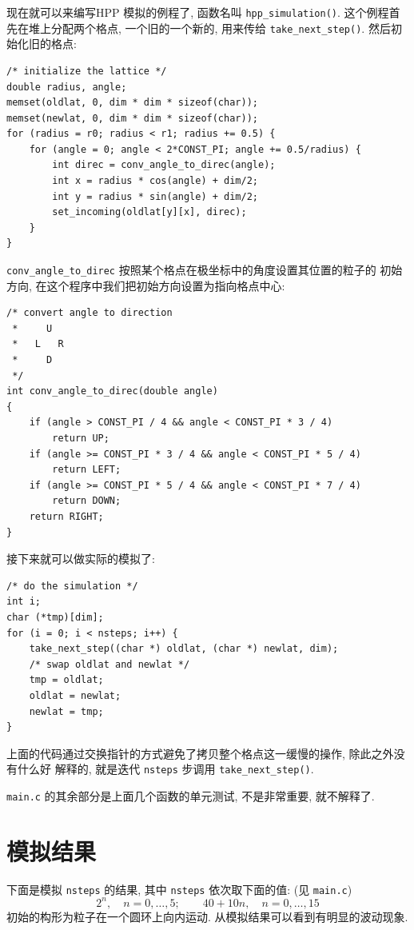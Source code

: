 \documentclass{ctexart}
\begin{document}
现在就可以来编写HPP 模拟的例程了, 函数名叫 \verb|hpp_simulation()|.
这个例程首先在堆上分配两个格点, 一个旧的一个新的, 用来传给 \verb|take_next_step()|.
然后初始化旧的格点:
\begin{verbatim}
/* initialize the lattice */
double radius, angle;
memset(oldlat, 0, dim * dim * sizeof(char));
memset(newlat, 0, dim * dim * sizeof(char));
for (radius = r0; radius < r1; radius += 0.5) {
    for (angle = 0; angle < 2*CONST_PI; angle += 0.5/radius) {
        int direc = conv_angle_to_direc(angle);
        int x = radius * cos(angle) + dim/2;
        int y = radius * sin(angle) + dim/2;
        set_incoming(oldlat[y][x], direc);
    }
}
\end{verbatim}
\verb|conv_angle_to_direc| 按照某个格点在极坐标中的角度设置其位置的粒子的
初始方向, 在这个程序中我们把初始方向设置为指向格点中心:
\begin{verbatim}
/* convert angle to direction
 *     U
 *   L   R
 *     D
 */
int conv_angle_to_direc(double angle)
{
    if (angle > CONST_PI / 4 && angle < CONST_PI * 3 / 4)
        return UP;
    if (angle >= CONST_PI * 3 / 4 && angle < CONST_PI * 5 / 4)
        return LEFT;
    if (angle >= CONST_PI * 5 / 4 && angle < CONST_PI * 7 / 4)
        return DOWN;
    return RIGHT;
}
\end{verbatim}

接下来就可以做实际的模拟了:
\begin{verbatim}
/* do the simulation */
int i;
char (*tmp)[dim];
for (i = 0; i < nsteps; i++) {
    take_next_step((char *) oldlat, (char *) newlat, dim);
    /* swap oldlat and newlat */
    tmp = oldlat;
    oldlat = newlat;
    newlat = tmp;
}
\end{verbatim}
上面的代码通过交换指针的方式避免了拷贝整个格点这一缓慢的操作, 除此之外没有什么好
解释的, 就是迭代 \verb|nsteps| 步调用 \verb|take_next_step()|.

\verb|main.c| 的其余部分是上面几个函数的单元测试, 不是非常重要, 就不解释了.

\section{模拟结果}
下面是模拟 \verb|nsteps| 的结果, 其中 \verb|nsteps| 依次取下面的值:
(见 \verb|main.c|)
\[
2^n,\quad n=0,\ldots, 5;\qquad
40+10n,\quad n=0,\ldots, 15
\]
初始的构形为粒子在一个圆环上向内运动. 从模拟结果可以看到有明显的波动现象.

\end{document}
